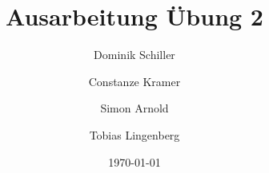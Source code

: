 \documentclass[
ngerman,
twoside,
pdfa=false,
ruledheaders=section,%
class=report,%
thesis={type=sta},%
accentcolor=TUDa-2c,%
custommargins=false,%
marginpar=false,%
parskip=half-,%
fontsize=11pt,%
]{tudapub}
\begin{document}
	\title{Ausarbeitung Übung 2}
	\author[D. Schiller, C. Kramer, S.Arnold, T. Lingenberg]{Dominik Schiller \and Constanze Kramer \and Simon Arnold \and Tobias Lingenberg} %
	
	\department{} %

	
	\date{\today}
	
	
	\maketitle
	
	
	
	
	
	\cleardoublepage
	\tableofcontents %
	
	\setcounter{page}{1} %
	
	
	
	
	
	
	
	
	\listoffigures %
	\listoftables %
	
	
	
\end{document}
